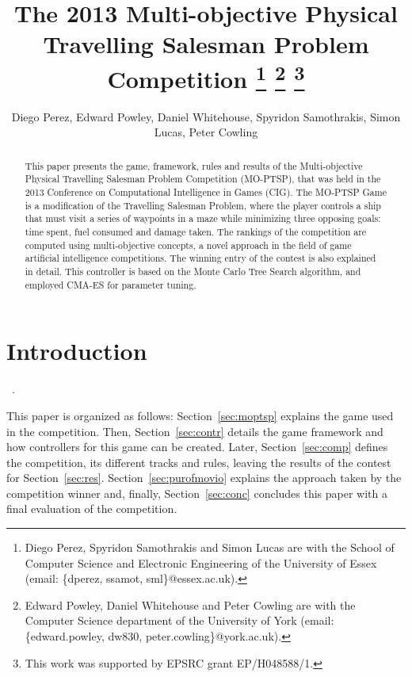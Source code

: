 \documentclass[conference]{IEEEtran}
\begin{document}
\title{The 2013 Multi-objective Physical Travelling Salesman Problem Competition \thanks{Diego Perez, Spyridon Samothrakis and Simon Lucas are with the School of Computer Science and Electronic Engineering of the University of Essex (email: \{dperez, ssamot, sml\}@essex.ac.uk).} \thanks{Edward Powley, Daniel Whitehouse and Peter Cowling are with the Computer Science department of the University of York (email:  \{edward.powley, dw830, peter.cowling\}@york.ac.uk).} \thanks{This work was supported by EPSRC grant EP/H048588/1.}}

\author{Diego Perez, Edward Powley, Daniel Whitehouse, Spyridon Samothrakis, Simon Lucas, Peter Cowling}


\maketitle

\begin{abstract}
This paper presents the game, framework, rules and results of the Multi-objective Physical Travelling Salesman Problem Competition (MO-PTSP), that was held in the 2013 Conference on Computational Intelligence in Games (CIG). The MO-PTSP Game is a modification of the Travelling Salesman Problem, where the player controls a ship that must visit a series of waypoints in a maze while minimizing three opposing goals: time spent, fuel consumed and damage taken. The rankings of the competition are computed using multi-objective concepts, a novel approach in the field of game artificial intelligence competitions. The winning entry of the contest is also explained in detail. This controller is based on the Monte Carlo Tree Search algorithm, and employed CMA-ES for parameter tuning. 
\end{abstract}


\section{Introduction}

~\cite{PerezCEC2012}.

This paper is organized as follows: Section~\ref{sec:moptsp} explains the game used in the competition. Then, Section~\ref{sec:contr} details the game framework and how controllers for this game can be created. Later, Section~\ref{sec:comp} defines the competition, its different tracks and rules, leaving the results of the contest for Section~\ref{sec:res}. Section~\ref{sec:purofmovio} explains the approach taken by the competition winner and, finally, Section~\ref{sec:conc} concludes this paper with a final evaluation of the competition.
\end{document}
